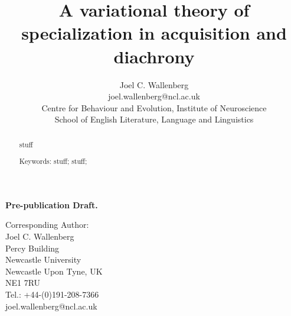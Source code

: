 \documentclass{artikel3}
\begin{document}
\title{A variational theory of specialization in acquisition and diachrony}

\author{Joel C. Wallenberg \vspace*{3mm} \\ \small{joel.wallenberg@ncl.ac.uk} \\ \small{Centre for Behaviour and Evolution, Institute of Neuroscience}\\
\small{School of English Literature, Language and Linguistics}}




\date{}



\maketitle

\textbf{Pre-publication Draft.}\\


\begin{abstract}
stuff

\noindent Keywords: stuff; stuff; 

\end{abstract}
\vspace*{5mm}
\noindent Corresponding Author:\vspace*{3mm}\\
Joel C. Wallenberg\\
Percy Building\\
Newcastle University\\
Newcastle Upon Tyne, UK\\
NE1 7RU\\
Tel.: +44-(0)191-208-7366\\
joel.wallenberg@ncl.ac.uk

\pagebreak
\end{document}
